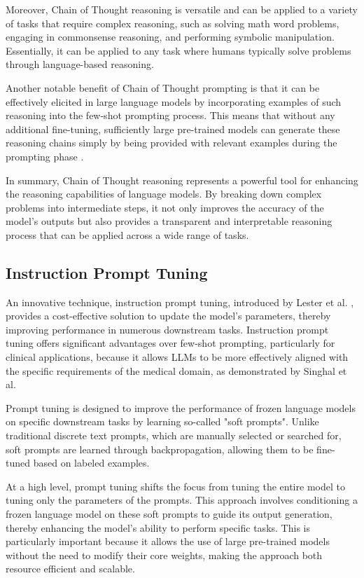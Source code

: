 Moreover, Chain of Thought reasoning is versatile and can be applied to a variety of tasks that require complex reasoning, such as solving math word problems, engaging in commonsense reasoning, and performing symbolic manipulation. Essentially, it can be applied to any task where humans typically solve problems through language-based reasoning.

Another notable benefit of Chain of Thought prompting is that it can be effectively elicited in large language models by incorporating examples of such reasoning into the few-shot prompting process. This means that without any additional fine-tuning, sufficiently large pre-trained models can generate these reasoning chains simply by being provided with relevant examples during the prompting phase \cite{wei2022chain}.

In summary, Chain of Thought reasoning represents a powerful tool for enhancing the reasoning capabilities of language models. By breaking down complex problems into intermediate steps, it not only improves the accuracy of the model’s outputs but also provides a transparent and interpretable reasoning process that can be applied across a wide range of tasks.

\subsection{Instruction Prompt Tuning}


An innovative technique, instruction prompt tuning, introduced by Lester et al. \cite{lester2021power}, provides a cost-effective solution to update the model's parameters, thereby improving performance in numerous downstream tasks. Instruction prompt tuning offers significant advantages over few-shot prompting, particularly for clinical applications, because it allows LLMs to be more effectively aligned with the specific requirements of the medical domain, as demonstrated by Singhal et al. \cite{singhal2022large}

Prompt tuning is designed to improve the performance of frozen language models on specific downstream tasks by learning so-called "soft prompts". Unlike traditional discrete text prompts, which are manually selected or searched for, soft prompts are learned through backpropagation, allowing them to be fine-tuned based on labeled examples.

At a high level, prompt tuning shifts the focus from tuning the entire model to tuning only the parameters of the prompts. This approach involves conditioning a frozen language model on these soft prompts to guide its output generation, thereby enhancing the model's ability to perform specific tasks. This is particularly important because it allows the use of large pre-trained models without the need to modify their core weights, making the approach both resource efficient and scalable.

